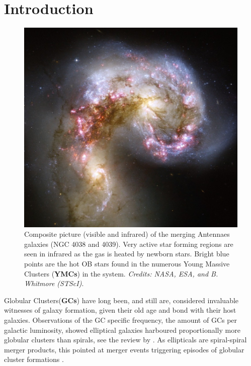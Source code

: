 



\chapter{Introduction}

\begin{figure}
\center
\includegraphics[width=0.9\linewidth]{Figures/0_antennas.jpg}
\caption[Visible and infrared Hubble picture of the Antennaes]{Composite picture (visible and infrared) of the merging Antennaes galaxies (NGC 4038 and 4039). Very active star forming regions are seen in infrared as the gas is heated by newborn stars. Bright blue points are the hot OB stars found in the numerous Young Massive Clusters (\textbf{YMCs}) in the system. \textit{Credits: NASA, ESA, and B. Whitmore (STScI)}.}
\label{Fig:0_antennas}
\end{figure}

\newpage




Globular Clusters(\textbf{GCs}) have long been, and still are, considered invaluable witnesses of galaxy formation, given their old age and bond with their host galaxies. Observations of the GC specific frequency, the amount of GCs per galactic luminosity, showed elliptical galaxies harboured proportionally more globular clusters than spirals, see the review by \cite{Harris1991}. As ellipticals are spiral-spiral merger products, this pointed at merger events triggering episodes of globular cluster formations \citep{Ashman1992}.

